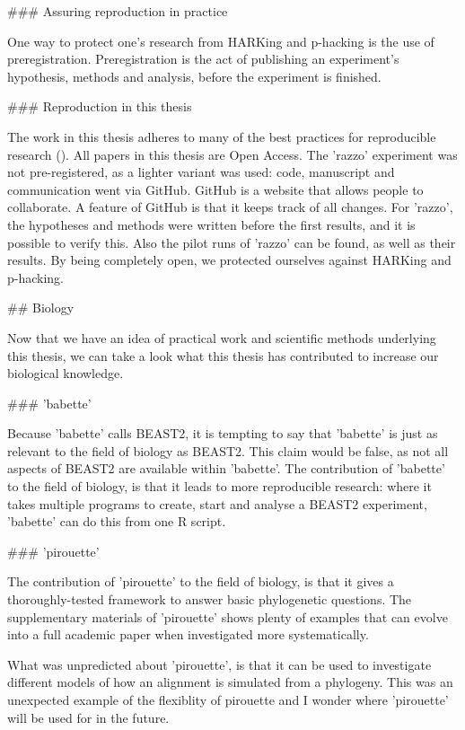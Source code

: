 ### Assuring reproduction in practice

One way to protect one's research from HARKing and p-hacking
is the use of preregistration. Preregistration is the act of
publishing an experiment's hypothesis, methods and analysis,
before the experiment is finished. 

### Reproduction in this thesis

The work in this thesis adheres to many of the best 
practices for reproducible research (\cite{munafo2017manifesto}).
All papers in this thesis are Open Access.
The 'razzo' experiment was not pre-registered, as a lighter variant was used:
code, manuscript and communication went via GitHub. GitHub is a website that
allows people to collaborate. A feature of GitHub is that it keeps track
of all changes. For 'razzo', the hypotheses and methods were written
before the first results, and it is possible to verify this.
Also the pilot runs of 'razzo' can be found, as well as their results.
By being completely open, we protected ourselves against HARKing and
p-hacking.

## Biology

Now that we have an idea of practical work and scientific methods underlying
this thesis, we can take a look what this thesis has contributed to
increase our biological knowledge. 

### 'babette'

Because 'babette' calls BEAST2, it is tempting to say that 'babette'
is just as relevant to the field of biology as BEAST2. 
This claim would be false, as not all aspects of BEAST2 are available
within 'babette'. The contribution of 'babette' to the field of biology, 
is that it leads to more reproducible research: where it takes multiple
programs to create, start and analyse a BEAST2 experiment, 'babette'
can do this from one R script. 

### 'pirouette' 

The contribution of 'pirouette' to the field of biology, 
is that it gives a thoroughly-tested framework to answer
basic phylogenetic questions. The supplementary materials 
of 'pirouette' shows plenty of examples that can evolve into
a full academic paper when investigated more systematically.

What was unpredicted about 'pirouette', is that it can be used to 
investigate different models of how an alignment is simulated
from a phylogeny. This was an unexpected example of the flexiblity of 
pirouette and I wonder where 'pirouette' will be used for in the future.

